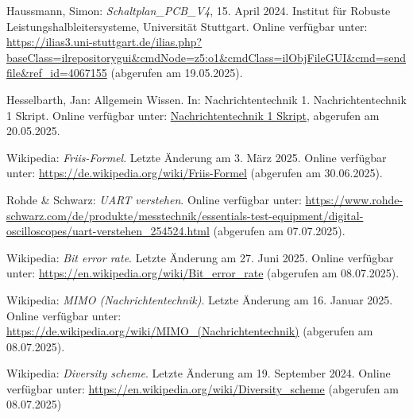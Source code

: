 \begin{thebibliography}{1}

Haussmann, Simon: \emph{Schaltplan\_PCB\_V4}, 15. April 2024. Institut für Robuste Leistungshalbleitersysteme, Universität Stuttgart. Online verfügbar unter: \url{https://ilias3.uni-stuttgart.de/ilias.php?baseClass=ilrepositorygui&cmdNode=z5:o1&cmdClass=ilObjFileGUI&cmd=sendfile&ref_id=4067155} (abgerufen am 19.05.2025).

Hesselbarth, Jan: Allgemein Wissen. In: Nachrichtentechnik 1. Nachrichtentechnik 1 Skript. Online verfügbar unter: \url{Nachrichtentechnik 1 Skript}, abgerufen am 20.05.2025.

Wikipedia: \emph{Friis-Formel}. Letzte Änderung am 3. März 2025.  
Online verfügbar unter: \url{https://de.wikipedia.org/wiki/Friis-Formel} (abgerufen am 30.06.2025).

Rohde \& Schwarz: \emph{UART verstehen}.  Online verfügbar unter: \url{https://www.rohde-schwarz.com/de/produkte/messtechnik/essentials-test-equipment/digital-oscilloscopes/uart-verstehen_254524.html} (abgerufen am 07.07.2025).

Wikipedia: \emph{Bit error rate}. Letzte Änderung am 27. Juni 2025.  
Online verfügbar unter: \url{https://en.wikipedia.org/wiki/Bit_error_rate} (abgerufen am 08.07.2025).

Wikipedia: \emph{MIMO (Nachrichtentechnik)}. Letzte Änderung am 16. Januar 2025.  
Online verfügbar unter: \url{https://de.wikipedia.org/wiki/MIMO_(Nachrichtentechnik)} (abgerufen am 08.07.2025).

Wikipedia: \emph{Diversity scheme}. Letzte Änderung am 19. September 2024.
Online verfügbar unter: \url{https://en.wikipedia.org/wiki/Diversity_scheme} (abgerufen am 08.07.2025)

\end{thebibliography}

\clearpage
